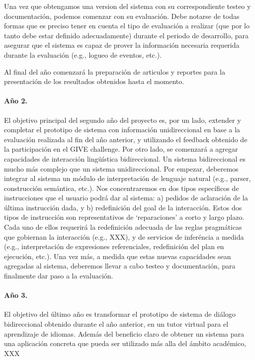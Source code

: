 Una vez que obtengamos una version del sistema con su
correspondiente testeo y documentaci\'on, podemos comenzar con
su evaluaci\'on.  Debe notarse de todas formas que es preciso tener en cuenta
el tipo de evaluaci\'on a realizar (que por lo tanto debe estar definido
adecuadamente) durante el periodo de desarrollo, para asegurar que el sistema
es capaz de prover la informaci\'on necesaria requerida durante la evaluaci\'on
(e.g., logueo de eventos, etc.).

Al final del a\~no comenzar\'a la preparaci\'on de articulos y reportes para
la presentaci\'on de los resultados obtenidos hasta el momento.

\paragraph{A\~no 2.} El objetivo principal del segundo a\~no del proyecto es,
por un lado, extender y completar el prototipo de sistema con informaci\'on
unidireccional en base a la evaluaci\'on realizada al fin del a\~no anterior,
y utilizando el feedback obtenido de la
participaci\'on en el GIVE challenge.  Por otro lado, se comenzar\'a a agregar
capacidades de interacci\'on ling\"u\'istica bidireccional.  Un sistema
bidireccional es mucho m\'as complejo que un sistema unidireccional.  Por
empezar, deberemos integrar al sistema un m\'odulo de interpretaci\'on de
lenguaje natural (e.g., parser, construcci\'on sem\'antica, etc.).  Nos
concentraremos en dos tipos espec\'ificos de instrucciones que el usuario
podr\'a dar al sistema: a) pedidos de aclaraci\'on de la \'ultima
instrucci\'on dada, y b) redefinici\'on del goal de la interacci\'on.  Estos
dos tipos de instrucci\'on son representativos de `reparaciones' a corto y
largo plazo.  Cada uno de ellos requerir\'a la redefinici\'on adecuada de
las reglas pragm\'aticas que gobiernan la interacci\'on (e.g., XXX),  y de servicios
de infer\'encia a medida (e.g., interpretaci\'on de expresiones referenciales,
redefinici\'on del plan en ejecuci\'on, etc.).  Una vez m\'as, a medida que
estas nuevas capacidades sean agregadas al sistema, deberemos llevar a
cabo testeo y documentaci\'on, para finalmente dar paso a la evaluaci\'on.



\paragraph{A\~no 3.} El objetivo del \'ultimo a\~no es transformar el prototipo
de sistema de di\'alogo bidireccional obtenido durante el a\~no anterior, en un
tutor virtual para el aprendizaje de idiomas.  Adem\'as del beneficio claro de
obtener un sistema para una aplicaci\'on concreta que pueda ser utilizado
m\'as alla del \'ambito acad\'emico, XXX 

